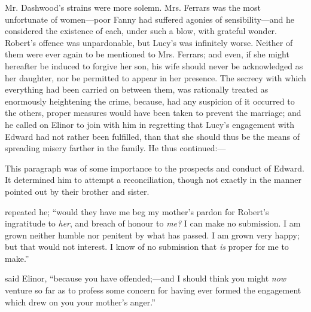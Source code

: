 Mr. Dashwood's strains were more solemn. Mrs. Ferrars was the most unfortunate of women---poor Fanny had suffered agonies of sensibility---and he considered the existence of each, under such a blow, with grateful wonder. Robert's offence was unpardonable, but Lucy's was infinitely worse. Neither of them were ever again to be mentioned to Mrs. Ferrars; and even, if she might hereafter be induced to forgive her son, his wife should never be acknowledged as her daughter, nor be permitted to appear in her presence. The secrecy with which everything had been carried on between them, was rationally treated as enormously heightening the crime, because, had any suspicion of it occurred to the others, proper measures would have been taken to prevent the marriage; and he called on Elinor to join with him in regretting that Lucy's engagement with Edward had not rather been fulfilled, than that she should thus be the means of spreading misery farther in the family. He thus continued:---


This paragraph was of some importance to the prospects and conduct of Edward. It determined him to attempt a reconciliation, though not exactly in the manner pointed out by their brother and sister.

 repeated he; “would they have me beg my mother's pardon for Robert's ingratitude to {\em her}, and breach of honour to {\em me?} I can make no submission. I am grown neither humble nor penitent by what has passed. I am grown very happy; but that would not interest. I know of no submission that {\em is} proper for me to make.”

 said Elinor, “because you have offended;---and I should think you might {\em now} venture so far as to profess some concern for having ever formed the engagement which drew on you your mother's anger.”

